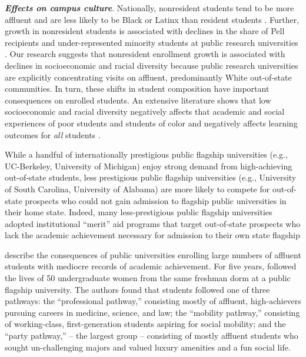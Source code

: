 \documentclass[twoside]{article}
\begin{document}

\textbf{\textit{Effects on campus culture}}.  Nationally, nonresident students tend to be more affluent and are less likely to be Black or Latinx than resident students \citep{RN3685}. Further, growth in nonresident students is associated with declines in the share of Pell recipients and under-represented minority students at public research universities \citep{RN3685}.  Our research suggests that nonresident enrollment growth is associated with declines in socioeconomic and racial diversity because public research universities are explicitly concentrating visits on affluent, predominantly White out-of-state communities.  In turn, these shifts in student composition have important consequences on enrolled students.  An extensive literature shows that low socioeconomic and racial diversity negatively affects that academic and social experiences of poor students and students of color \citep[e.g., ][]{RN3205,RN3193,RN3639,RN3185} and negatively affects learning outcomes for \textit{all} students \citep[e.g., ][]{RN3026,RN2576,RN3153,RN3174}.

While a handful of internationally prestigious public flagship universities (e.g., UC-Berkeley, University of Michigan) enjoy strong demand from high-achieving out-of-state students, less prestigious public flagship universities (e.g., University of South Carolina, University of Alabama) are more likely to compete for out-of-state prospects who could not gain admission to flagship public universities in their home state.  Indeed, many less-prestigious public flagship universities adopted institutional ``merit'' aid programs that target out-of-state prospects who lack the academic achievement necessary for admission to their own state flagship \citep{RN1469,RN3762,RN4032,RN4409}


\cite{RN4231} describe the consequences of public universities enrolling large numbers of affluent students with mediocre records of academic achievement.  For five years, \cite{RN4231} followed the lives of 50 undergraduate women from the same freshman dorm at a public flagship university. The authors found that students followed one of three pathways: the ``professional pathway,'' consisting mostly of affluent, high-achievers pursuing careers in medicine, science, and law; the ``mobility pathway,'' consisting of working-class, first-generation students aspiring for social mobility; and the ``party pathway,'' -- the largest group -- consisting of mostly affluent students who sought un-challenging majors and valued luxury amenities and a fun social life. 
\end{document}
